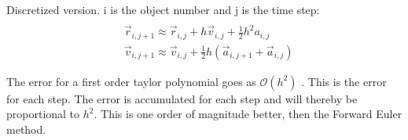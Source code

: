Discretized version. i is the object number and j is the time step:
\begin{align*}
	\\
	&\vec{r}_{i,j+1} \approx \vec{r}_{i,j} + h \vec{v}_{i,j} + \frac{1}{2} h^2 a_{i,j}
	\\
	&\vec{v}_{i,j+1} \approx \vec{v}_{i,j} +\frac{1}{2} h(\vec{a}_{i,j+1} + \vec{a}_{i,j})
\end{align*}


The error for a first order taylor polynomial goes as $\mathcal{O}(h^2)$ . This is the error for each step. The error is accumulated for each step and will thereby be proportional to $h^2$. This is one order of magnitude better, then the Forward Euler method. 
















